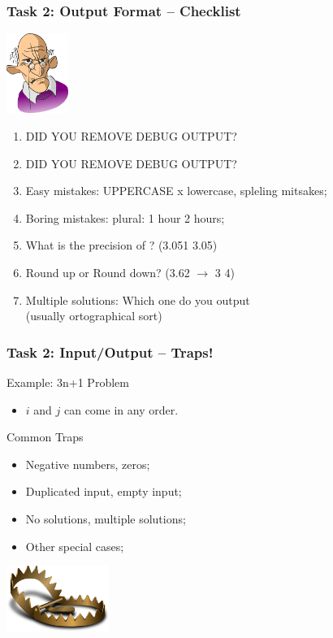 \documentclass{beamer}
\begin{document}
\begin{frame}
  \frametitle{Task 2: Output Format -- Checklist}

  \includegraphics[width=0.15\textwidth]{../img/angryclient}
  \begin{enumerate}
    \item DID YOU REMOVE DEBUG OUTPUT?
    \item DID YOU REMOVE DEBUG OUTPUT?
    \smallskip

    \item Easy mistakes: UPPERCASE x lowercase, spleling mitsakes;
    \item Boring mistakes: plural: 1 hour  2 hours;
    \item What is the precision of ? (3.051  3.05)
    \item Round up or Round down? (3.62 $\rightarrow$ 3  4)
    \item Multiple solutions: Which one do you output\\ (usually ortographical sort)
  \end{enumerate}
\end{frame}


\begin{frame}
  \frametitle{Task 2: Input/Output -- Traps!}

  \begin{block}{Example: 3n+1 Problem}
    \begin{itemize}
    \item $i$ and $j$ can come in any order.
    \end{itemize}
  \end{block}

  \begin{block}{Common Traps}
    \begin{itemize}
    \item Negative numbers, zeros;
    \item Duplicated input, empty input;
    \item No solutions, multiple solutions;
    \item Other special cases;
    \end{itemize}
  \end{block}
  \vfill

  \hfill \includegraphics[width=0.25\textwidth]{../img/trap}
\end{frame}
\end{document}
